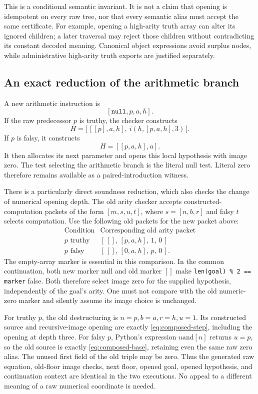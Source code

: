 \documentclass[11pt,letterpaper]{article}
\theoremstyle{definition}\newtheorem{definition}[theorem]{Definition}
\theoremstyle{remark}\newtheorem{remark}[theorem]{Remark}
\begin{document}
This is a conditional semantic invariant.  It is not a claim that
opening is idempotent on every raw tree, nor that every semantic alias
must accept the same certificate.  For example, opening a high-arity
truth array can alter its ignored children; a later traversal may
reject those children without contradicting its constant decoded
meaning.  Canonical object expressions avoid surplus nodes, while
administrative high-arity truth exports are justified separately.

\subsection{An exact reduction of the arithmetic branch}

A new arithmetic instruction is
\[
                         [\mathtt{null},p,a,h].
\]
If the raw predecessor $p$ is truthy, the checker constructs
\[
 H=\bigl[\,[[p],a,h],\ i(h,[p,a,h],3)\,\bigr].
 \tag{C1}\label{eq:composed-step}
\]
If $p$ is falsy, it constructs
\[
                         H=[[p,a,h],a].
 \tag{C0}\label{eq:composed-base}
\]
It then allocates its next parameter and opens this local hypothesis
with image zero.  The test selecting the arithmetic branch is the
literal null test.  Literal zero therefore remains available as a
paired-introduction witness.

There is a particularly direct soundness reduction, which also checks
the change of numerical opening depth.  The old arity checker accepts
constructed-computation packets of the form
$[m,s,u,t]$, where $s=[n,b,r]$ and falsy $t$ selects computation.
Use the following old packets for the new packet above:
\[
\begin{array}{c|c}
\text{Condition}&\text{Corresponding old arity packet}\\\hline
p\text{ truthy}&[\,[],\,[p,a,h],\,1,\,0\,]\\
p\text{ falsy}&[\,[],\,[0,a,h],\,p,\,0\,].
\end{array}
\tag{Packet correspondence}\label{eq:packet-correspondence}
\]
The empty-array marker is essential in this comparison.  In the common
continuation, both new marker null and old marker $[]$ make
\texttt{len(goal) \% 2 == marker} false.  Both therefore select image
zero for the supplied hypothesis, independently of the goal's arity.
One must not compare with the old numeric-zero marker and silently
assume its image choice is unchanged.

For truthy $p$, the old destructuring is
$n=p,b=a,r=h,u=1$.  Its constructed source and recursive-image opening
are exactly \eqref{eq:composed-step}, including the opening at depth
three.  For falsy $p$, Python's expression $u\mathbin{\mathrm{and}}[n]$
returns $u=p$, so the old source is exactly
\eqref{eq:composed-base}, retaining even the same raw zero alias.
The unused first field of the old triple may be zero.  Thus the generated
raw equation, old-floor image checks, next floor, opened goal, opened
hypothesis, and continuation context are identical in the two
executions.  No appeal to a different meaning of a raw numerical
coordinate is needed.
\end{document}
